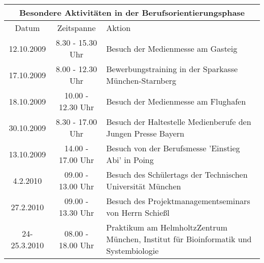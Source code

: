 \documentclass[a4paper,12pt,oneside]{scrbook}
\begin{document}
\vspace{2cm}
\begin{tabular}{ccp{10cm}} \hline
\toprule
\multicolumn{3}{c}{\large Besondere Aktivitäten in der Berufsorientierungsphase} \\\midrule
Datum & Zeitspanne & Aktion \\ \hline
12.10.2009 & 8.30 - 15.30 Uhr & Besuch der Medienmesse am Gasteig \\
17.10.2009 & 8.00 - 12.30 Uhr & Bewerbungstraining in der Sparkasse München-Starnberg \\
18.10.2009 & 10.00 - 12.30 Uhr & Besuch der Medienmesse am Flughafen\\ 
30.10.2009 & 8.30 - 17.00 Uhr & Besuch der Haltestelle Medienberufe den Jungen Presse Bayern \\
13.10.2009 & 14.00 - 17.00 Uhr & Besuch von der Berufsmesse 'Einstieg Abi' in Poing \\ 
4.2.2010 & 09.00 - 13.00 Uhr & Besuch des Schülertags der Technischen Universität München \\
27.2.2010 & 09.00 - 13.30 Uhr & Besuch des Projektmanagementseminars von Herrn Schießl\\
24-25.3.2010 & 08.00 - 18.00 Uhr & Praktikum am HelmholtzZentrum München, Institut für Bioinformatik und Systembiologie\\
\end{tabular}\\\\\

\newpage
\end{document}
